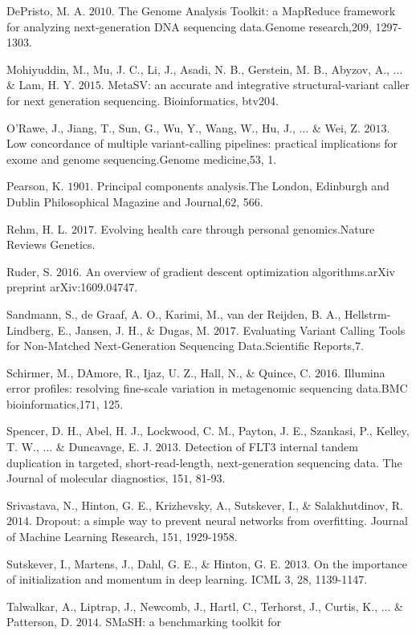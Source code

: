 \documentclass{article}
\begin{document}
\begin{list}{}{%
\setlength{\topsep}{0pt}%
\setlength{\leftmargin}{0.5in}%
\setlength{\listparindent}{-0.5in}%
\setlength{\itemindent}{-0.5in}%
\setlength{\parsep}{\parskip}%
}
DePristo, M. A. \(2010\). The Genome Analysis Toolkit: a MapReduce framework for analyzing next-generation DNA sequencing data.Genome research,20\(9\), 1297-1303.\\\item[] Mohiyuddin, M., Mu, J. C., Li, J., Asadi, N. B., Gerstein, M. B., Abyzov, A., ... \& Lam, H. Y. \(2015\). MetaSV: an accurate and integrative structural-variant caller for next generation sequencing. Bioinformatics, btv204.\\\item[] O'Rawe, J., Jiang, T., Sun, G., Wu, Y., Wang, W., Hu, J., ... \& Wei, Z. \(2013\). Low concordance of multiple variant-calling pipelines: practical implications for exome and genome sequencing.Genome medicine,5\(3\), 1.\\\item[] Pearson, K. \(1901\). Principal components analysis.The London, Edinburgh and Dublin Philosophical Magazine and Journal,6\(2\), 566.\\\item[] Rehm, H. L. \(2017\). Evolving health care through personal genomics.Nature Reviews Genetics.\\\item[] Ruder, S. \(2016\). An overview of gradient descent optimization algorithms.arXiv preprint arXiv:1609.04747.\\\item[] Sandmann, S., de Graaf, A. O., Karimi, M., van der Reijden, B. A., Hellstrm-Lindberg, E., Jansen, J. H., \& Dugas, M. \(2017\). Evaluating Variant Calling Tools for Non-Matched Next-Generation Sequencing Data.Scientific Reports,7.\\\item[] Schirmer, M., DAmore, R., Ijaz, U. Z., Hall, N., \& Quince, C. \(2016\). Illumina error profiles: resolving fine-scale variation in metagenomic sequencing data.BMC bioinformatics,17\(1\), 125.\\\item[] Spencer, D. H., Abel, H. J., Lockwood, C. M., Payton, J. E., Szankasi, P., Kelley, T. W., ... \& Duncavage, E. J. \(2013\). Detection of FLT3 internal tandem duplication in targeted, short-read-length, next-generation sequencing data. The Journal of molecular diagnostics, 15\(1\), 81-93.\\\item[] Srivastava, N., Hinton, G. E., Krizhevsky, A., Sutskever, I., \& Salakhutdinov, R. \(2014\). Dropout: a simple way to prevent neural networks from overfitting. Journal of Machine Learning Research, 15\(1\), 1929-1958.\\\item[] Sutskever, I., Martens, J., Dahl, G. E., \& Hinton, G. E. \(2013\). On the importance of initialization and momentum in deep learning. ICML \(3\), 28, 1139-1147.\\\item[] Talwalkar, A., Liptrap, J., Newcomb, J., Hartl, C., Terhorst, J., Curtis, K., ... \& Patterson, D. \(2014\). SMaSH: a benchmarking toolkit for 
\end{list}
\end{document}

